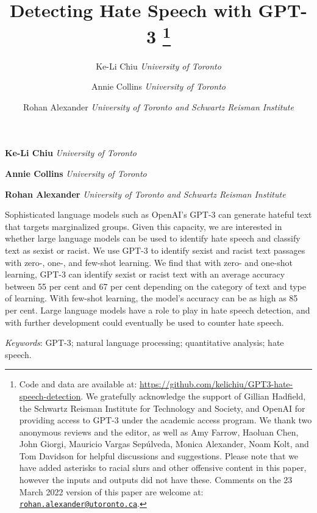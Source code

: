 \documentclass[12pt,]{article}
\title{Detecting Hate Speech with GPT-3 \thanks{Code and data are available at: \url{https://github.com/kelichiu/GPT3-hate-speech-detection}. We gratefully acknowledge the support of Gillian Hadfield, the Schwartz Reisman Institute for Technology and Society, and OpenAI for providing access to GPT-3 under the academic access program. We thank two anonymous reviews and the editor, as well as Amy Farrow, Haoluan Chen, John Giorgi, Mauricio Vargas Sepúlveda, Monica Alexander, Noam Kolt, and Tom Davidson for helpful discussions and suggestions. Please note that we have added asterisks to racial slurs and other offensive content in this paper, however the inputs and outputs did not have these. Comments on the 23 March 2022 version of this paper are welcome at: \href{mailto:rohan.alexander@utoronto.ca}{\nolinkurl{rohan.alexander@utoronto.ca}}.}  }
\author{\Large Ke-Li Chiu\vspace{0.05in} \newline\normalsize\emph{University of Toronto}   \and \Large Annie Collins\vspace{0.05in} \newline\normalsize\emph{University of Toronto}   \and \Large Rohan Alexander\vspace{0.05in} \newline\normalsize\emph{University of Toronto and Schwartz Reisman Institute}  }
\date{}
\newcommand*{\authorfont}{\fontfamily{phv}\selectfont}
\renewenvironment{abstract}
 {{%
    \setlength{\leftmargin}{0mm}
    \setlength{\rightmargin}{\leftmargin}%
  }%
  \relax}
 {\endlist}
\begin{document}
	
%    


{%
\setlength{\parindent}{0pt}
\thispagestyle{plain}
{\fontsize{18}{20}\selectfont\raggedright 
\maketitle  %

}

{
   \vskip 13.5pt\relax \normalsize\fontsize{11}{12} 
\textbf{\authorfont Ke-Li Chiu} \hskip 15pt \emph{\small University of Toronto}   \par \textbf{\authorfont Annie Collins} \hskip 15pt \emph{\small University of Toronto}   \par \textbf{\authorfont Rohan Alexander} \hskip 15pt \emph{\small University of Toronto and Schwartz Reisman Institute}   

}

}








\begin{abstract}

    \hbox{\vrule height .2pt width 39.14pc}

    \vskip 8.5pt %

\noindent Sophisticated language models such as OpenAI's GPT-3 can generate hateful text that targets marginalized groups. Given this capacity, we are interested in whether large language models can be used to identify hate speech and classify text as sexist or racist. We use GPT-3 to identify sexist and racist text passages with zero-, one-, and few-shot learning. We find that with zero- and one-shot learning, GPT-3 can identify sexist or racist text with an average accuracy between 55 per cent and 67 per cent depending on the category of text and type of learning. With few-shot learning, the model's accuracy can be as high as 85 per cent. Large language models have a role to play in hate speech detection, and with further development could eventually be used to counter hate speech.


\vskip 8.5pt \noindent \emph{Keywords}: GPT-3; natural language processing; quantitative analysis; hate speech. \par

    \hbox{\vrule height .2pt width 39.14pc}



\end{abstract}
\end{document}

